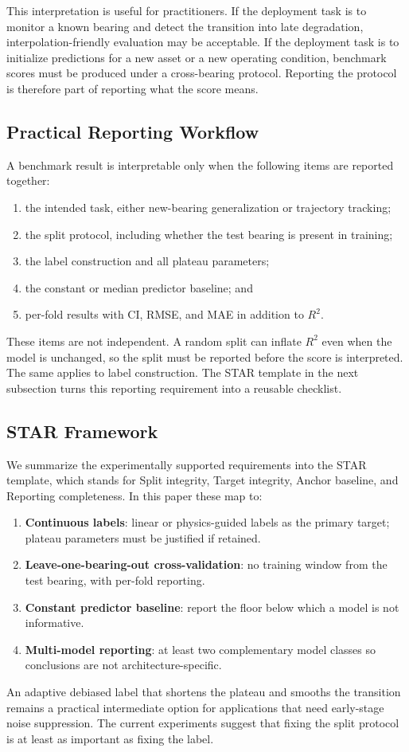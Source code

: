 \documentclass[pdflatex,sn-mathphys-num]{sn-jnl}
\begin{document}
This interpretation is useful for practitioners. If the deployment task is to monitor a known bearing and detect the transition into late degradation, interpolation-friendly evaluation may be acceptable. If the deployment task is to initialize predictions for a new asset or a new operating condition, benchmark scores must be produced under a cross-bearing protocol. Reporting the protocol is therefore part of reporting what the score means.

\subsection{Practical Reporting Workflow}
A benchmark result is interpretable only when the following items are reported together:
\begin{enumerate}
    \item the intended task, either new-bearing generalization or trajectory tracking;
    \item the split protocol, including whether the test bearing is present in training;
    \item the label construction and all plateau parameters;
    \item the constant or median predictor baseline; and
    \item per-fold results with CI, RMSE, and MAE in addition to $R^2$.
\end{enumerate}
These items are not independent. A random split can inflate $R^2$ even when the model is unchanged, so the split must be reported before the score is interpreted. The same applies to label construction. The STAR template in the next subsection turns this reporting requirement into a reusable checklist.

\subsection{STAR Framework}
We summarize the experimentally supported requirements into the STAR template, which stands for Split integrity, Target integrity, Anchor baseline, and Reporting completeness. In this paper these map to:
\begin{enumerate}
    \item \textbf{Continuous labels}: linear or physics-guided labels as the primary target; plateau parameters must be justified if retained.
    \item \textbf{Leave-one-bearing-out cross-validation}: no training window from the test bearing, with per-fold reporting.
    \item \textbf{Constant predictor baseline}: report the floor below which a model is not informative.
    \item \textbf{Multi-model reporting}: at least two complementary model classes so conclusions are not architecture-specific.
\end{enumerate}
An adaptive debiased label that shortens the plateau and smooths the transition remains a practical intermediate option for applications that need early-stage noise suppression. The current experiments suggest that fixing the split protocol is at least as important as fixing the label.
\end{document}
